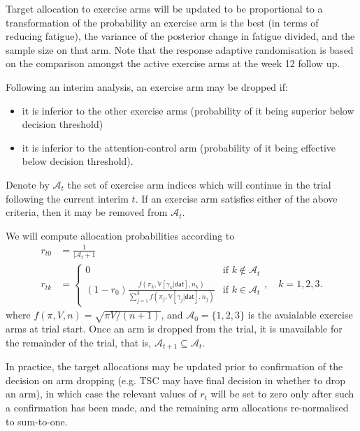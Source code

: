 \documentclass[11pt,parskip=half-]{scrartcl}
\providecommand{\tightlist}{%
  \setlength{\itemsep}{0pt}\setlength{\parskip}{0pt}}
\begin{document}
Target allocation to exercise arms will be updated to be proportional to a transformation of the probability an exercise arm is the best (in terms of reducing fatigue), the variance of the posterior change in fatigue divided, and the sample size on that arm. Note that the response adaptive randomisation is based on the comparison amongst the active exercise arms at the week 12 follow up.

Following an interim analysis, an exercise arm may be dropped if:
\begin{itemize}\tightlist
  \item it is inferior to the other exercise arms (probability of it being superior below decision threshold)
  \item it is inferior to the attention-control arm (probability of it being effective below decision threshold).
\end{itemize}

Denote by $\mathcal{A}_t$ the set of exercise arm indices which will continue in the trial following the current interim $t$. If an exercise arm satisfies either of the above criteria, then it may be removed from $\mathcal{A}_t$.

We will compute allocation probabilities according to
$$
  \begin{aligned}
    r_{t0} & = \frac{1}{|\mathcal{A}_t + 1}               \\
    r_{tk} & = \begin{cases}
      0                                                                                                                              & \text{if } k \notin \mathcal{A}_t \\
      (1 - r_0) \frac{f(\pi_k, \mathbb V[\gamma_k|\mathsf{dat}], n_k)}{\sum_{j=1}^3 f(\pi_j, \mathbb V[\gamma_j|\mathsf{dat}], n_j)} & \text{if }k\in\mathcal{A}_t
    \end{cases}, \quad k=1,2,3.
  \end{aligned}
$$
where $f(\pi, V, n) = \sqrt{\pi V/(n + 1)}$, and $\mathcal{A}_0 = \{1,2,3\}$ is the avaialable exercise arms at trial start. Once an arm is dropped from the trial, it is unavailable for the remainder of the trial, that is, $\mathcal{A}_{t+1} \subseteq \mathcal{A}_t$.

In practice, the target allocations may be updated prior to confirmation of the decision on arm dropping (e.g. TSC may have final decision in whether to drop an arm), in which case the relevant values of $r_t$ will be set to zero only after such a confirmation has been made, and the remaining arm allocations re-normalised to sum-to-one.
\end{document}
